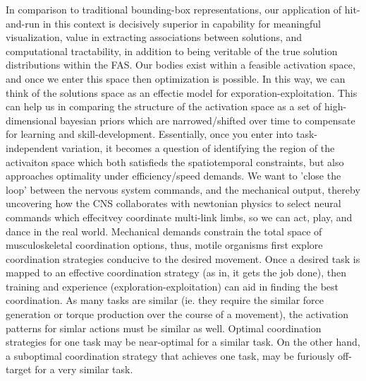 In comparison to traditional bounding-box representations, our application of hit-and-run in this context is decisively superior in capability for meaningful visualization, value in extracting associations between solutions, and computational tractability, in addition to being veritable of the true solution distributions within the FAS. Our bodies exist within a feasible activation space, and once we enter this space then optimization is possible. In this way, we can think of the solutions space as an effectie model for exporation-exploitation.
This can help us in comparing the structure of the activation space as a set of high-dimensional bayesian priors which are narrowed/shifted over time to compensate for learning and skill-development.
Essentially, once you enter into task-independent variation, it becomes a question of identifying the region of the activaiton space which both satisfieds the spatiotemporal constraints, but also approaches optimality under efficiency/speed demands.
We want to 'close the loop' between the nervous system commands, and the mechanical output, thereby uncovering how the CNS collaborates with newtonian physics to select neural commands which effecitvey coordinate multi-link limbs, so we can act, play, and dance in the real world.
Mechanical demands constrain the total space of musculoskeletal coordination options, thus, motile organisms first explore coordination strategies conducive to the desired movement.
Once a desired task is mapped to an effective coordination strategy (as in, it gets the job done), then training and experience (exploration-exploitation) can aid in finding the best coordination.
As many tasks are similar (ie. they require the similar force generation or torque production over the course of a movement),  the activation patterns for simlar actions must be similar as well.
Optimal coordination strategies for one task may be near-optimal for a similar task.
On the other hand, a suboptimal coordination strategy that achieves one task, may be furiously off-target for a very similar task.

